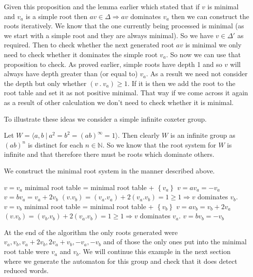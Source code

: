 \documentclass[a4paper,12pt]{article}
\begin{document}
Given this proposition and the lemma earlier which stated that if $v$ is minimal and $v_a$ is a simple root then $av \in \Delta \Rightarrow av$ dominates $v_a$ then we can construct the roots iteratively. We know that the one currently being processed is minimal (as we start with a simple root and they are always minimal). So we have $v \in \Delta'$ as required. Then to check whether the next generated root $av$ is minimal we only need to check whether it dominates the simple root $v_a$. So now we can use that proposition to check. As proved earlier, simple roots have depth 1 and so $v$ will always have depth greater than (or equal to) $v_a$. As a result we need not consider the depth but only whether $(v \: . \: v_a) \geq 1$. If it is then we add the root to the root table and set it as not positive minimal. That way if we come across it again as a result of other calculation we don't need to check whether it is minimal.

To illustrate these ideas we consider a simple infinite coxeter group.

\begin{example}
	\label{dihedral_inf_example}
	Let $W = \langle a,b \: | \: a^2 = b^2 = (ab)^{\infty} = 1\rangle$. Then clearly $W$ is an infinite group as $(ab)^n$ is distinct for each $n \in \mathbb{N}$. So we know that the root system for $W$ is infinite and that therefore there must be roots which dominate others.
	
	We construct the minimal root system in the manner described above.
	
	\begin{algorithmic}[1]
		\STATE $v = v_a$
		\STATE minimal root table = minimal root table + $\left\{v_a\right\}$ 
		\STATE $v = av_a = -v_a$ 
		\STATE $v = bv_a = v_a + 2v_b$
		\STATE $(v.v_b) = (v_a.v_a) + 2(v_a.v_b) = 1 \geq 1 \Rightarrow v$ dominates $v_b$.
		\STATE $v = v_b$
		\STATE minimal root table = minimal root table + $\left\{v_b\right\}$
		\STATE $v = av_b = v_b + 2v_a$
		\STATE $(v.v_b) = (v_b.v_b) + 2(v_a.v_b) = 1 \geq 1 \Rightarrow v$ dominates $v_a$.
		\STATE $v = bv_b = -v_b$
	\end{algorithmic}
	
	At the end of the algorithm the only roots generated were $v_a, v_b, v_a + 2v_b, 2v_a + v_b, -v_a, -v_b$ and of those the only ones put into the minimal root table were $v_a$ and $v_b$. We will continue this example in the next section where we generate the automaton for this group and check that it does detect reduced words.
\end{example}
\end{document}
